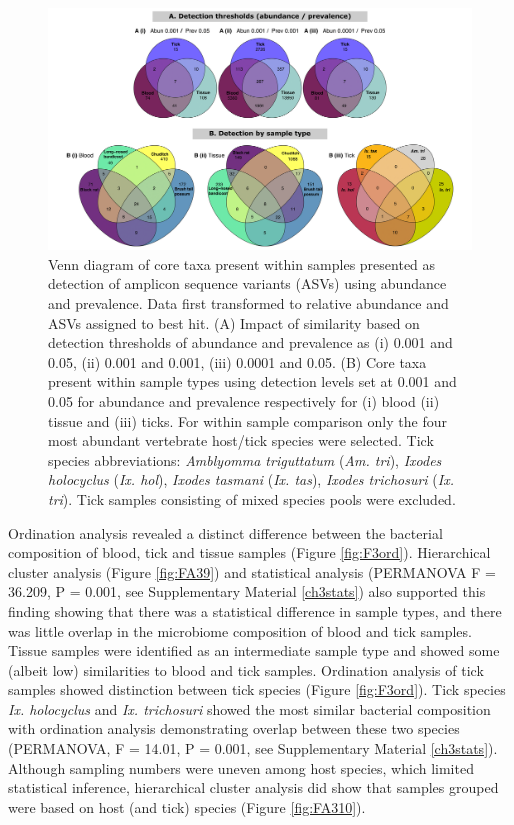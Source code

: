 \documentclass[a4paper, nobind]{templates/ociamthesis}
\begin{document}
\begin{figure}
\includegraphics[width=0.95\linewidth]{figures/ms-figs/Ch3-venn_combine} \caption[Venn diagram of taxa present in blood, tick and tissues.]{Venn diagram of core taxa present within samples presented as detection of amplicon sequence variants (ASVs) using abundance and prevalence. Data first transformed to relative abundance and ASVs assigned to best hit. (A) Impact of similarity based on detection thresholds of abundance and prevalence as (i) 0.001 and 0.05, (ii) 0.001 and 0.001, (iii) 0.0001 and 0.05. (B) Core taxa present within sample types using detection levels set at 0.001 and 0.05 for abundance and prevalence respectively for (i) blood (ii) tissue and (iii) ticks. For within sample comparison only the four most abundant vertebrate host/tick species were selected. Tick species abbreviations: \textit{Amblyomma triguttatum} (\textit{Am. tri}), \textit{Ixodes holocyclus} (\textit{Ix. hol}), \textit{Ixodes tasmani} (\textit{Ix. tas}), \textit{Ixodes trichosuri} (\textit{Ix. tri}). Tick samples consisting of mixed species pools were excluded.}\label{fig:F3venn}
\end{figure}

Ordination analysis revealed a distinct difference between the bacterial composition of blood, tick and tissue samples (Figure \ref{fig:F3ord}). Hierarchical cluster analysis (Figure \ref{fig:FA39}) and statistical analysis (PERMANOVA F = 36.209, P = 0.001, see Supplementary Material \ref{ch3stats}) also supported this finding showing that there was a statistical difference in sample types, and there was little overlap in the microbiome composition of blood and tick samples.
Tissue samples were identified as an intermediate sample type and showed some (albeit low) similarities to blood and tick samples. Ordination analysis of tick samples showed distinction between tick species (Figure \ref{fig:F3ord}).
Tick species \emph{Ix. holocyclus} and \emph{Ix. trichosuri} showed the most similar bacterial composition with ordination analysis demonstrating overlap between these two species (PERMANOVA, F = 14.01, P = 0.001, see Supplementary Material \ref{ch3stats}).
Although sampling numbers were uneven among host species, which limited statistical inference, hierarchical cluster analysis did show that samples grouped were based on host (and tick) species (Figure \ref{fig:FA310}).
\end{document}
